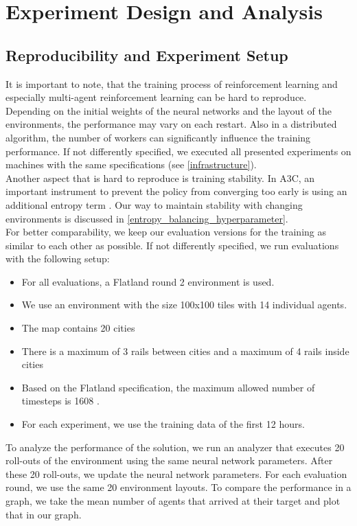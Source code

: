\chapter{Experiment Design and Analysis}
\label{chap.experiment}

\section[Reproducibility]{Reproducibility and Experiment Setup}\label{reproducability}
It is important to note, that the training process of reinforcement learning and especially multi-agent reinforcement learning can be hard to reproduce. Depending on the initial weights of the neural networks and the layout of the environments, the performance may vary on each restart. Also in a distributed algorithm, the number of workers can significantly influence the training performance. If not differently specified, we executed all presented experiments on machines with the same specifications (see \autoref{infrastructure}).\\
Another aspect that is hard to reproduce is training stability. In A3C, an important instrument to prevent the policy from converging too early is using an additional entropy term \cite{a3c}. Our way to maintain stability with changing environments is discussed in \autoref{entropy_balancing_hyperparameter}.\\
For better comparability, we keep our evaluation versions for the training as similar to each other as possible. If not differently specified, we run evaluations with the following setup:
\begin{itemize}
	\item For all evaluations, a Flatland round 2 environment is used.
	\item We use an environment with the size 100x100 tiles with 14 individual agents.
	\item The map contains 20 cities
	\item There is a maximum of 3 rails between cities and a maximum of 4 rails inside cities
	\item Based on the Flatland specification, the maximum allowed number of timesteps is 1608 \cite{flatland_spec}.
	\item For each experiment, we use the training data of the first 12 hours.
\end{itemize}
To analyze the performance of the solution, we run an analyzer that executes 20 roll-outs of the environment using the same neural network parameters. After these 20 roll-outs, we update the neural network parameters. For each evaluation round, we use the same 20 environment layouts.
To compare the performance in a graph, we take the mean number of agents that arrived at their target and plot that in our graph.
